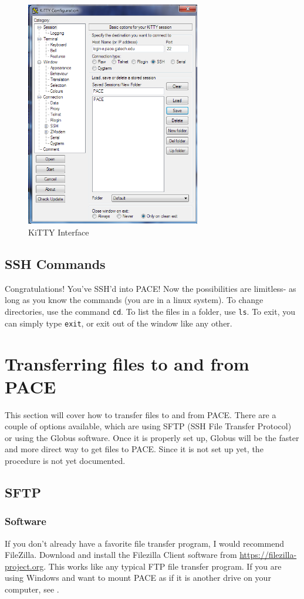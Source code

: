 \documentclass{article}
\begin{document}
	\begin{figure}[h!]
		\centering
		\includegraphics[width=3in]{./kitty.png} 
		\caption{KiTTY Interface}
	\end{figure}
	
	\subsection{SSH Commands}
	Congratulations!  You've SSH'd into PACE!  Now the possibilities are limitless- as long as you know the commands (you are in a linux system).  To change directories, use the command \nolinkurl{cd}.  To list the files in a folder, use \nolinkurl{ls}.  To exit, you can simply type \nolinkurl{exit}, or exit out of the window like any other.

	\section{Transferring files to and from PACE}
	This section will cover how to transfer files to and from PACE.  There are a couple of options available, which are using SFTP (SSH File Transfer Protocol) or using the Globus software.  Once it is properly set up, Globus will be the faster and more direct way to get files to PACE.  Since it is not set up yet, the procedure is not yet documented.

	\subsection{SFTP}
	
	\subsubsection{Software}
	\label{software}
	If you don't already have a favorite file transfer program, I would recommend FileZilla.  Download and install the Filezilla Client software from \url{https://filezilla-project.org}.  This works like any typical FTP file transfer program.  If you are using Windows and want to mount PACE as if it is another drive on your computer, see .
	
\end{document}
